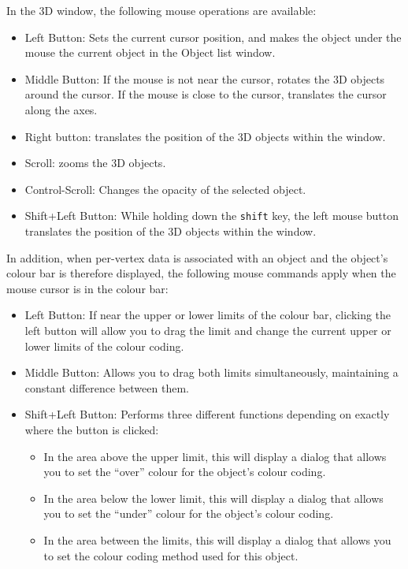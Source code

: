 \documentclass[11pt,letterpaper]{article}
\newcommand{\ident}[1]{{\tt #1}}
\begin{document}
In the 3D window, the following mouse operations are available:

\begin{itemize}
\item Left Button: Sets the current cursor position, and makes the 
object under the mouse the current object in the Object list window.
\item Middle Button: If the mouse is not near the cursor, rotates the 3D
objects around the cursor. If the mouse is close to the cursor, translates
the cursor along the axes.
\item Right button: translates the position of the 3D objects within the
window.
\item Scroll: zooms the 3D objects.
\item Control-Scroll: Changes the opacity of the selected object.
\item Shift+Left Button: While holding down the \ident{shift} key, the
 left mouse button translates the position of the 3D objects within
 the window.
\end{itemize}

In addition, when per-vertex data is associated with an object and the
object's colour bar is therefore displayed, the following mouse commands
apply when the mouse cursor is in the colour bar:
\begin{itemize}
\item Left Button: If near the upper or lower limits of the colour bar,
clicking the left button will allow you to drag the limit and change the
current upper or lower limits of the colour coding.
\item Middle Button: Allows you to drag both limits simultaneously, maintaining a 
constant difference between them.
\item Shift+Left Button: Performs three different functions depending on
exactly where the button is clicked:
\begin{itemize}
\item In the area above the upper limit,
 this will display a dialog that allows you to set the ``over'' colour
 for the object's colour coding.
\item In the area below the lower limit,
 this will display a dialog that allows you to set the ``under'' colour
 for the object's colour coding.
\item In the area between the limits, this will display a dialog that
allows you to set the colour coding method used for this object.
\end{itemize}
\end{itemize}
\end{document}
